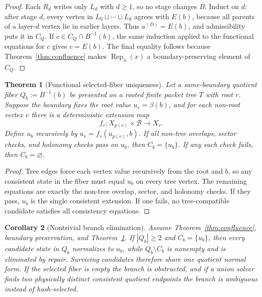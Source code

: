 \documentclass[11pt]{article}
\newtheorem{theorem}{Theorem}[section]
\newtheorem{corollary}[theorem]{Corollary}
\begin{document}
\begin{proof}
Each \(R_d\) writes only \(L_d\) with \(d\ge1\), so no stage changes \(B\).  Induct on \(d\): after
stage \(d\), every vertex in \(L_0\sqcup\cdots\sqcup L_d\) agrees with \(E(b)\), because all
parents of a layer-\(d\) vertex lie in earlier layers.  Thus \(a^{(D)}=E(b)\), and admissibility
puts it in \(C_Q\).  If \(c\in C_Q\cap B^{-1}(b)\), the same induction applied to the functional
equations for \(c\) gives \(c=E(b)\).  The final equality follows because
Theorem~\ref{thm:confluence} makes \(\operatorname{Rep}_\lambda(x)\) a boundary-preserving element
of \(C_Q\).
\end{proof}

\begin{theorem}[Functional selected-fiber uniqueness]\label{thm:functional-selected-fiber}
Let a same-boundary quotient fiber \(Q_b:=B^{-1}(b)\) be presented on a rooted finite packet tree
\(T\) with root \(r\). Suppose the boundary fixes the root value \(u_r=\beta(b)\), and for each
non-root vertex \(v\) there is a deterministic extension map
\[
f_v:X_{p(v)}\times\mathcal B\to X_v .
\]
Define \(u_b\) recursively by \(u_v=f_v(u_{p(v)},b)\). If all non-tree overlaps, sector checks,
and holonomy checks pass on \(u_b\), then \(C_b=\{u_b\}\). If any such check fails, then
\(C_b=\varnothing\).
\end{theorem}

\begin{proof}
Tree edges force each vertex value recursively from the root and \(b\), so any consistent state in
the fiber must equal \(u_b\) on every tree vertex. The remaining equations are exactly the
non-tree overlap, sector, and holonomy checks. If they pass, \(u_b\) is the single consistent
extension. If one fails, no tree-compatible candidate satisfies all consistency equations.
\end{proof}

\begin{corollary}[Nontrivial branch elimination]\label{cor:branch-elimination}
Assume Theorem~\ref{thm:confluence}, boundary preservation, and
Theorem~\ref{thm:functional-selected-fiber}. If \(|Q_b|\ge2\) and \(C_b=\{u_b\}\), then every
candidate state in \(Q_b\) normalizes to \(u_b\), while \(Q_b\setminus C_b\) is nonempty and is
eliminated by repair. Surviving candidates therefore share one quotient normal form. If the
selected fiber is empty the branch is obstructed, and if a union solver finds two physically
distinct consistent quotient endpoints the branch is ambiguous instead of hash-selected.
\end{corollary}
\end{document}
